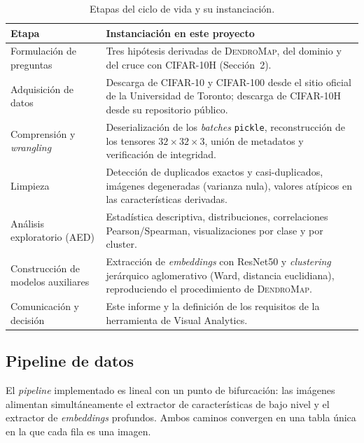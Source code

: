 \documentclass[11pt,a4paper]{article}
\begin{document}
\begin{table}[H]
\centering
\small
\begin{tabular}{@{}p{3.2cm}p{11cm}@{}}
\toprule
\textbf{Etapa} & \textbf{Instanciación en este proyecto} \\
\midrule
Formulación de preguntas & Tres hipótesis derivadas de \textsc{DendroMap}, del dominio y del cruce con CIFAR-10H (Sección~2). \\
Adquisición de datos & Descarga de CIFAR-10 y CIFAR-100 desde el sitio oficial de la Universidad de Toronto; descarga de CIFAR-10H desde su repositorio público. \\
Comprensión y \emph{wrangling} & Deserialización de los \emph{batches} \texttt{pickle}, reconstrucción de los tensores $32{\times}32{\times}3$, unión de metadatos y verificación de integridad. \\
Limpieza & Detección de duplicados exactos y casi-duplicados, imágenes degeneradas (varianza nula), valores atípicos en las características derivadas. \\
Análisis exploratorio (AED) & Estadística descriptiva, distribuciones, correlaciones Pearson/Spearman, visualizaciones por clase y por cluster. \\
Construcción de modelos auxiliares & Extracción de \emph{embeddings} con ResNet50 y \emph{clustering} jerárquico aglomerativo (Ward, distancia euclidiana), reproduciendo el procedimiento de \textsc{DendroMap}. \\
Comunicación y decisión & Este informe y la definición de los requisitos de la herramienta de Visual Analytics. \\
\bottomrule
\end{tabular}
\caption{Etapas del ciclo de vida y su instanciación.}
\label{tab:ciclovida}
\end{table}

\subsection{Pipeline de datos}

El \emph{pipeline} implementado es lineal con un punto de bifurcación: las
imágenes alimentan simultáneamente el extractor de características de bajo nivel
y el extractor de \emph{embeddings} profundos. Ambos caminos convergen en una
tabla única en la que cada fila es una imagen.
\end{document}
